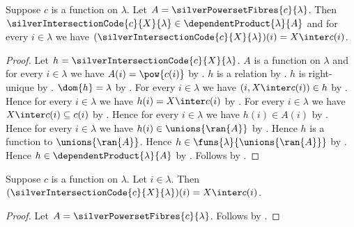 \begin{proposition}\label{silver_intersection_code_type}
    Suppose $c$ is a function on $\lambda$.
    Let $A=\silverPowersetFibres{c}{\lambda}$.
    Then $\silverIntersectionCode{c}{X}{\lambda}
        \in\dependentProduct{\lambda}{A}$ and
        for every $i\in\lambda$ we have
            $(\silverIntersectionCode{c}{X}{\lambda})(i)=X\inter c(i)$.
\end{proposition}
\begin{proof}
    Let $h=\silverIntersectionCode{c}{X}{\lambda}$.
    $A$ is a function on $\lambda$ and
        for every $i\in\lambda$ we have $A(i)=\pow{c(i)}$
        by .
    $h$ is a relation by .
    $h$ is right-unique
        by .
    $\dom{h}=\lambda$
        by .
    For every $i\in\lambda$ we have $(i,X\inter c(i))\in h$
        by .
    Hence for every $i\in\lambda$ we have $h(i)=X\inter c(i)$
        by .
    For every $i\in\lambda$ we have $X\inter c(i)\subseteq c(i)$
        by .
    Hence for every $i\in\lambda$ we have $h(i)\in A(i)$
        by .
    Hence for every $i\in\lambda$ we have
        $h(i)\in\unions{\ran{A}}$
        by .
    Hence $h$ is a function to $\unions{\ran{A}}$.
    Hence $h\in\funs{\lambda}{\unions{\ran{A}}}$
        by .
    Hence $h\in\dependentProduct{\lambda}{A}$
        by .
    Follows by \auto.
\end{proof}

\begin{proposition}\label{silver_intersection_code_application}
    Suppose $c$ is a function on $\lambda$.
    Let $i\in\lambda$.
    Then $(\silverIntersectionCode{c}{X}{\lambda})(i)=X\inter c(i)$.
\end{proposition}
\begin{proof}
    Let $A=\silverPowersetFibres{c}{\lambda}$.
    Follows by .
\end{proof}

